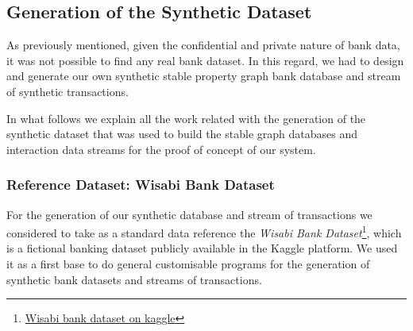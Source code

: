 \subsection{Generation of the Synthetic Dataset}

As previously mentioned, given the confidential and private nature of bank data, it was not possible to find any real bank dataset. In this regard, we had to design and generate our own synthetic stable property graph bank database and stream of synthetic transactions. 


In what follows we explain all the work related with the generation of the synthetic dataset that was used to build the stable graph databases and interaction data streams for the proof of concept of our system.

\subsubsection*{Reference Dataset: Wisabi Bank Dataset}

For the generation of our synthetic database and stream of transactions we considered to take as a standard data reference the \emph{Wisabi Bank Dataset}\footnote{\href{https://www.kaggle.com/datasets/obinnaiheanachor/wisabi-bank-dataset}{Wisabi bank dataset on kaggle}}, which is a fictional banking dataset publicly available in the Kaggle platform. We used it as a first base to do general customisable programs for the generation of synthetic bank datasets and streams of transactions.

